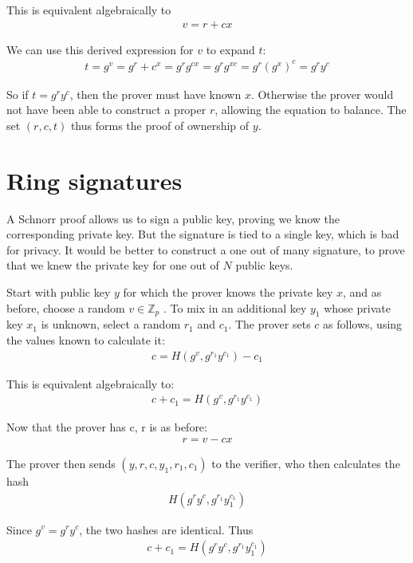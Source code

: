 \documentclass{article}
\begin{document}
This is equivalent algebraically to
\begin{eqnarray}
  v = r + cx
\end{eqnarray}

We can use this derived expression for $v$ to expand $t$:
\begin{eqnarray}
  t = g^v= g^r + c^x = g^r g^{cx} = g^r g^{xc} = g^r (g^x)^c = g^r y^c
\end{eqnarray}

So if $t = g^r y^c$, then the prover must have known $x$.  Otherwise the prover would not have been able to construct a proper $r$, allowing the equation to balance.  The set $(r,c,t)$ thus forms the proof of ownership of $y$.



\section{Ring signatures}

A Schnorr proof allows us to sign a public key, proving we know the corresponding private key.  But the signature is tied to a single key, which is bad for privacy.  It would be better to construct a one out of many signature, to prove that we knew the private key for one out of $N$ public keys.

Start with public key $y$ for which the prover knows the private key $x$, and as before, choose a random $v \in \mathbb{Z}_p$ . To mix in an additional key $y_1$ whose private key $x_1$ is unknown, select a random $r_1$ and $c_1$.  The prover sets $c$ as follows, using the values known to calculate it:
\begin{eqnarray}
  c = H(g^v, g^{r_1} y^{c_1}) - c_1
\end{eqnarray}

This is equivalent algebraically to:
\begin{eqnarray}
  c + c_1 = H(g^v, g^{r_1} y^{c_1})
\end{eqnarray}

Now that the prover has c, r is as before:
\begin{eqnarray}
  r = v - cx
\end{eqnarray}

The prover then sends $(y, r, c, y_1, r_1, c_1)$ to the verifier, who then calculates the hash
\begin{eqnarray}
  H(g^r y^c, g^{r_1} y_1^{c_1})
\end{eqnarray}

Since $g^v = g^r y^c$, the two hashes are identical.  Thus 
\begin{eqnarray}
  c + c_1 = H(g^r y^c, g^{r_1} y_1^{c_1})
\end{eqnarray}
\end{document}
